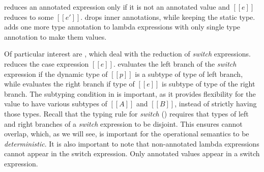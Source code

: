 reduces an annotated expression only if it is not an annotated value and $[[e]]$
reduces to some $[[e']]$.  drops inner
annotations, while keeping the static type.
 adds one more type annotation to
lambda expressions with only single type annotation to make them values.

\begin{comment}
\Rref{step-beta} deals with a special case, that occurs when the
argument of a function is a non-annotatted lambda expression.
With bi-directional type-checking an expression such as:
($[[\f.f 1:(Int -> Int -> Int) : (Int -> Int -> Int)]]$)($[[\x.x]]$)
\bruno{example here.} \baber{Done.}
is well-typed, since bi-directional type-checking propagates
type information to the arguments. Thus, the dynamic semantics
needs to deal with such programs.
We emphasize the fact that $[[\x.e]]$ is not a value in \cal.
The rule follows the same approach as
\rref{step-beta} except that both of the input types are kept with
$[[\x.e]]$ during substitution i.e $[[\x.e:A2:A1]]$. \Rref{step-ann}
reduces an annotated expression only if it is not a value and $[[e]]$
reduces to some $[[e']]$. \Rref{step-rmann} drops inner
annotations. \Rref{step-lamann} adds one more type annotation with
lambda expressions having single type annotation to make them values.
\end{comment}

Of particular interest are
, which deal with the reduction
of \emph{switch} expressions.
 reduces the case expression $[[e]]$.  
 evaluates
the left branch of the \emph{switch} expression if the dynamic type of $[[p]]$ is
a subtype of type of left branch, while  evaluates the right
branch if type of $[[e]]$ is subtype
of type of the right branch. The subtyping condition in 
 is important, as it provides
flexibility for the value to have various subtypes of $[[A]]$ and $[[B]]$, instead
of strictly having those types. Recall that
the typing rule for \emph{switch} () requires that
types of left and right branches of a \emph{switch}
expression to be disjoint.
This ensures  cannot overlap, which, as we will
see, is important for the
operational semantics to be \textit{deterministic}.
It is also important to note that non-annotated lambda expressions cannot appear
in the switch expression. Only annotated values appear in a switch expression.


